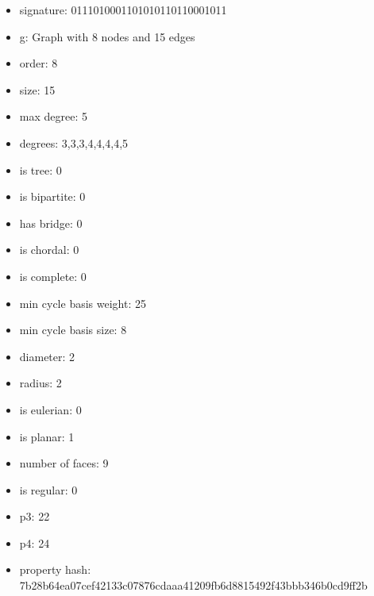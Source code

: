\begin{itemize}
\item signature: 0111010001101010110110001011
\item g: Graph with 8 nodes and 15 edges
\item order: 8
\item size: 15
\item max degree: 5
\item degrees: 3,3,3,4,4,4,4,5
\item is tree: 0
\item is bipartite: 0
\item has bridge: 0
\item is chordal: 0
\item is complete: 0
\item min cycle basis weight: 25
\item min cycle basis size: 8
\item diameter: 2
\item radius: 2
\item is eulerian: 0
\item is planar: 1
\item number of faces: 9
\item is regular: 0
\item p3: 22
\item p4: 24
\item property hash: 7b28b64ea07cef42133c07876cdaaa41209fb6d8815492f43bbb346b0cd9ff2b
\end{itemize}
\newpage
\begin{figure}
\end{figure}
